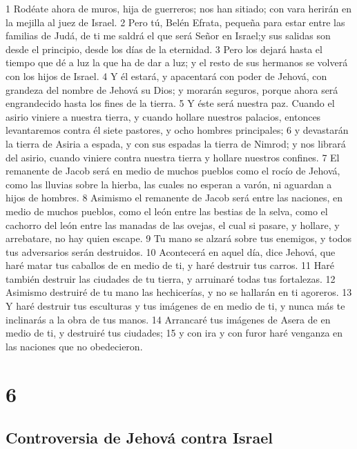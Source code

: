 1 Rodéate ahora de muros, hija de guerreros; nos han sitiado; con vara herirán en la mejilla al juez de Israel.
2 Pero tú, Belén Efrata, pequeña para estar entre las familias de Judá, de ti me saldrá el que será Señor en Israel;y sus salidas son desde el principio, desde los días de la eternidad.
3 Pero los dejará hasta el tiempo que dé a luz la que ha de dar a luz; y el resto de sus hermanos se volverá con los hijos de Israel.
4 Y él estará, y apacentará con poder de Jehová, con grandeza del nombre de Jehová su Dios; y morarán seguros, porque ahora será engrandecido hasta los fines de la tierra.
5 Y éste será nuestra paz. Cuando el asirio viniere a nuestra tierra, y cuando hollare nuestros palacios, entonces levantaremos contra él siete pastores, y ocho hombres principales;
6 y devastarán la tierra de Asiria a espada, y con sus espadas la tierra de Nimrod; y nos librará del asirio, cuando viniere contra nuestra tierra y hollare nuestros confines.
7 El remanente de Jacob será en medio de muchos pueblos como el rocío de Jehová, como las lluvias sobre la hierba, las cuales no esperan a varón, ni aguardan a hijos de hombres.
8 Asimismo el remanente de Jacob será entre las naciones, en medio de muchos pueblos, como el león entre las bestias de la selva, como el cachorro del león entre las manadas de las ovejas, el cual si pasare, y hollare, y arrebatare, no hay quien escape.
9 Tu mano se alzará sobre tus enemigos, y todos tus adversarios serán destruidos.
10 Acontecerá en aquel día, dice Jehová, que haré matar tus caballos de en medio de ti, y haré destruir tus carros.
11 Haré también destruir las ciudades de tu tierra, y arruinaré todas tus fortalezas.
12 Asimismo destruiré de tu mano las hechicerías, y no se hallarán en ti agoreros.
13 Y haré destruir tus esculturas y tus imágenes de en medio de ti, y nunca más te inclinarás a la obra de tus manos.
14 Arrancaré tus imágenes de Asera de en medio de ti, y destruiré tus ciudades;
15 y con ira y con furor haré venganza en las naciones que no obedecieron.

\chapter{6}

\section*{Controversia de Jehová contra Israel}

